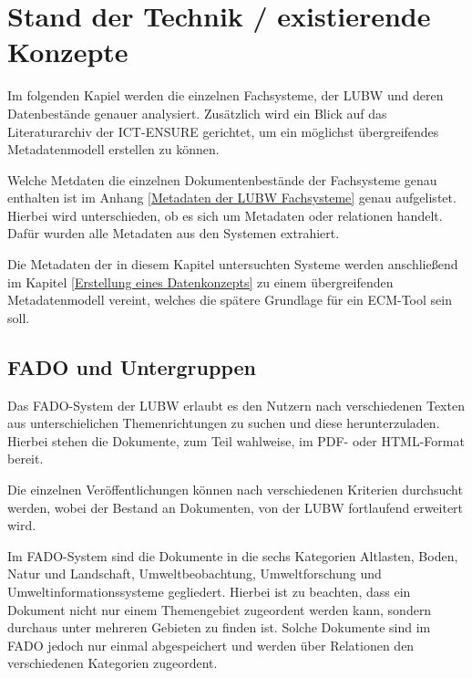 \section{Stand der Technik / existierende Konzepte} \label{Stand der Technik}
Im folgenden Kapiel werden die einzelnen Fachsysteme, der \ac{LUBW} und deren Datenbest\"ande genauer analysiert. Zus\"atzlich wird ein Blick auf das Literaturarchiv der \ac{ICT-ENSURE} gerichtet, um ein m\"oglichst \"ubergreifendes Metadatenmodell erstellen zu k\"onnen. 

Welche Metdaten die einzelnen Dokumentenbest\"ande der Fachsysteme genau enthalten ist im Anhang \ref{Metadaten der LUBW Fachsysteme} genau aufgelistet. Hierbei wird unterschieden, ob es sich um Metadaten oder relationen handelt. Daf\"ur wurden alle Metadaten aus den Systemen extrahiert.


Die Metadaten der in diesem Kapitel untersuchten Systeme werden anschlie\ss{}end im Kapitel \ref{Erstellung eines Datenkonzepts} zu einem \"ubergreifenden Metadatenmodell vereint, welches die sp\"atere Grundlage f\"ur ein \ac{ECM}-Tool sein soll.


\subsection{FADO und Untergruppen} \label{FADO}
Das \ac{FADO}-System der \ac{LUBW} erlaubt es den Nutzern nach verschiedenen Texten aus unterschielichen Themenrichtungen zu suchen und diese herunterzuladen. Hierbei stehen die Dokumente, zum Teil wahlweise, im PDF- oder HTML-Format bereit.

Die einzelnen Ver\"offentlichungen k\"onnen nach verschiedenen Kriterien durchsucht werden, wobei der Bestand an Dokumenten, von der \ac{LUBW} fortlaufend erweitert wird.
\cite{LUBW_FADO}

Im \ac{FADO}-System sind die Dokumente in die sechs Kategorien Altlasten, Boden, Natur und Landschaft, Umweltbeobachtung, Umweltforschung und Umweltinformationssysteme gegliedert. Hierbei ist zu beachten, dass ein Dokument nicht nur einem Themengebiet zugeordent werden kann, sondern durchaus unter mehreren Gebieten zu finden ist. Solche Dokumente sind im \ac{FADO} jedoch nur einmal abgespeichert und werden \"uber Relationen den verschiedenen Kategorien zugeordent.

